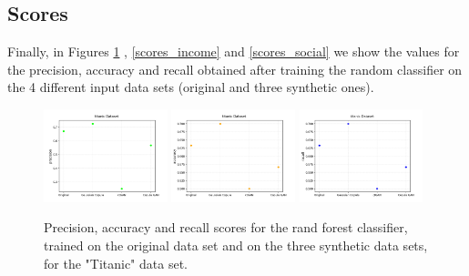 \documentclass{article}
\begin{document}
\subsection{Scores}
Finally, in Figures \ref{scores_titanic} , \ref{scores_income} and \ref{scores_social} we show the values for the precision, accuracy and recall obtained after training the random classifier on the 4 different input data sets (original and three synthetic ones). 


\begin{figure}[h!]
	\centering
	\includegraphics[width=0.32\textwidth]{../plots/results/titanic_precision.png}
	\includegraphics[width=0.32\textwidth]{../plots/results/titanic_accuracy.png}
	\includegraphics[width=0.32\textwidth]{../plots/results/titanic_recall.png}

	\caption{Precision, accuracy and recall scores for the rand forest classifier, trained on the original data set and on the three synthetic data sets, for the "Titanic" data set.}
	\label{scores_titanic}
\end{figure}
\end{document}
